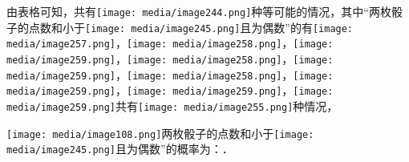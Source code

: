 \documentclass[a4paper,11pt,UTF8]{ctexart}
\begin{document}
由表格可知，共有\texttt{[image: media/image244.png]}种等可能的情况，其中``两枚骰子的点数和小于\texttt{[image: media/image245.png]}且为偶数''的有\texttt{[image: media/image257.png]}，\texttt{[image: media/image258.png]}，\texttt{[image: media/image259.png]}，\texttt{[image: media/image258.png]}，\texttt{[image: media/image259.png]}，\texttt{[image: media/image258.png]}，\texttt{[image: media/image259.png]}，\texttt{[image: media/image259.png]}，\texttt{[image: media/image259.png]}共有\texttt{[image: media/image255.png]}种情况，

\texttt{[image: media/image108.png]}两枚骰子的点数和小于\texttt{[image: media/image245.png]}且为偶数''的概率为：．
\end{document}
